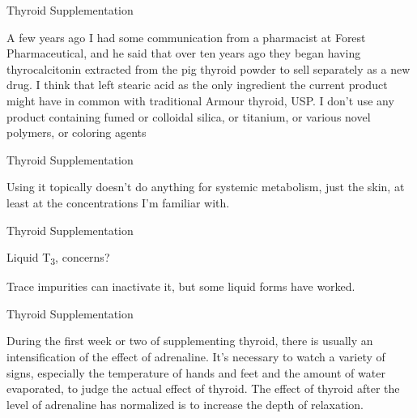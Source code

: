\documentclass[11pt,oneside,openany,extrafontsizes]{memoir}
\begin{document}
\begin{standalonequote}{Thyroid Supplementation}

    \begin{answer}
        A few years ago I had some communication from a pharmacist at Forest Pharmaceutical, and he said that over ten years ago they began having thyrocalcitonin extracted from the pig thyroid powder to sell separately as a new drug. I think that left stearic acid as the only ingredient the current product might have in common with traditional Armour thyroid, USP. I don't use any product containing fumed or colloidal silica, or titanium, or various novel polymers, or coloring agents
    \end{answer}
\end{standalonequote}

\begin{standalonequote}{Thyroid Supplementation}

    \begin{answer}
        Using it topically doesn't do anything for systemic metabolism, just the skin, at least at the concentrations I'm familiar with.
    \end{answer}
\end{standalonequote}

\begin{qaexchange}{Thyroid Supplementation}

    \begin{question}
        Liquid T\textsubscript{3}, concerns?
    \end{question}

    \begin{answer}
        Trace impurities can inactivate it, but some liquid forms have worked.
    \end{answer}
\end{qaexchange}

\begin{standalonequote}{Thyroid Supplementation}

    \begin{answer}
      During the first week or two of supplementing thyroid, there is usually an intensification of the effect of adrenaline. It's necessary to watch a variety of signs, especially the temperature of hands and feet and the amount of water evaporated, to judge the actual effect of thyroid. The effect of thyroid after the level of adrenaline has normalized is to increase the depth of relaxation.
    \end{answer}
\end{standalonequote}
\end{document}

